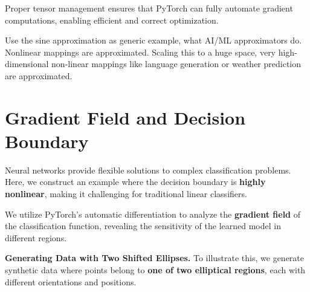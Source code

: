 Proper tensor management ensures that PyTorch can fully automate gradient computations, enabling efficient and correct optimization.

\begin{recommendationbox}
Use the sine approximation as generic example, what AI/ML approximators do. Nonlinear mappings are approximated. Scaling this to a huge space, very high-dimensional non-linear mappings like language generation or weather prediction are approximated. 
\end{recommendationbox}

%
\section{Gradient Field and Decision Boundary}

Neural networks provide flexible solutions to complex classification problems. Here, we construct an example where the decision boundary is \textbf{highly nonlinear}, making it challenging for traditional linear classifiers. 

We utilize PyTorch's automatic differentiation to analyze the \textbf{gradient field} of the classification function, revealing the sensitivity of the learned model in different regions.

{\bf Generating Data with Two Shifted Ellipses.} To illustrate this, we generate synthetic data where points belong to \textbf{one of two elliptical regions}, each with different orientations and positions.

